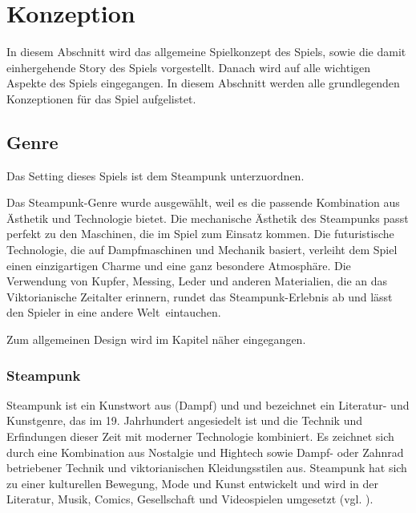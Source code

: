 \chapter{Konzeption}\label{sec:concept}
In diesem Abschnitt wird das allgemeine Spielkonzept des Spiels, sowie die damit einhergehende Story des Spiels vorgestellt. Danach wird auf alle wichtigen Aspekte des Spiels eingegangen. In diesem Abschnitt werden alle grundlegenden Konzeptionen für das Spiel aufgelistet.

\section{Genre}
Das Setting dieses Spiels ist dem Steampunk unterzuordnen.

Das Steampunk-Genre wurde ausgewählt, weil es die passende Kombination aus Ästhetik und Technologie bietet. Die mechanische Ästhetik des Steampunks passt perfekt zu den Maschinen, die im Spiel zum Einsatz kommen. Die futuristische Technologie, die auf Dampfmaschinen und Mechanik basiert, verleiht dem Spiel einen einzigartigen Charme und eine ganz besondere Atmosphäre. Die Verwendung von Kupfer, Messing, Leder und anderen Materialien, die an das Viktorianische Zeitalter erinnern, rundet das Steampunk-Erlebnis ab und lässt den Spieler in eine andere Welt eintauchen.

Zum allgemeinen Design wird im Kapitel  näher eingegangen.

\subsection{Steampunk}
Steampunk ist ein Kunstwort aus  (Dampf) und  und bezeichnet ein Literatur- und Kunstgenre, das im 19. Jahrhundert angesiedelt ist und die Technik und Erfindungen dieser Zeit mit moderner Technologie kombiniert. Es zeichnet sich durch eine Kombination aus Nostalgie und Hightech sowie Dampf- oder Zahnrad betriebener Technik und viktorianischen Kleidungsstilen aus. Steampunk hat sich zu einer kulturellen Bewegung, Mode und Kunst entwickelt und wird in der Literatur, Musik, Comics, Gesellschaft und Videospielen umgesetzt (vgl. \cite{noauthor_steampunk_nodate}).

